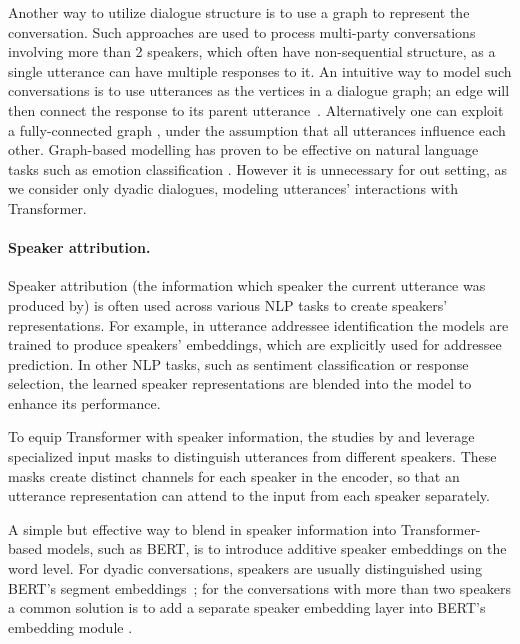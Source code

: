 Another way to utilize dialogue structure is to use a graph to represent the conversation. Such approaches are used to process multi-party conversations involving more than 2 speakers, which often have non-sequential structure, as a single utterance can have multiple responses to it. An intuitive way to model such conversations is to use utterances as the vertices in a dialogue graph; an edge will then connect the response to its parent utterance~\cite{hu2019gsn}. Alternatively one can exploit a fully-connected graph \cite{ghosal2019dialoguegcn}, under the assumption that all utterances influence each other. Graph-based modelling has proven to be effective on natural language tasks such as emotion classification \cite{zhang2019modeling, ghosal2019dialoguegcn}. However it is unnecessary for out setting, as we consider only dyadic dialogues, modeling utterances' interactions with Transformer. %

\paragraph{Speaker attribution.} Speaker attribution (the information which speaker the current utterance was produced by) is often used across various NLP tasks to create speakers' representations. For example, in utterance addressee identification \cite{le2019speaking, ouchi2016addressee} the models are trained to produce speakers' embeddings, which are explicitly used for addressee prediction. In other NLP tasks, such as sentiment classification or response selection, the learned speaker representations are blended into the model to enhance its performance.

To equip Transformer with speaker information, the studies by \citet{liu2021filling} and \citet{li2020hierarchical2} leverage specialized input masks to distinguish utterances from different speakers. These masks create distinct channels for each speaker in the encoder, so that an utterance representation can attend to the input from each speaker separately.

A simple but effective way to blend in speaker information into Transformer-based models, such as BERT, is to introduce additive speaker embeddings on the word level. For dyadic conversations, speakers are usually distinguished using BERT's segment embeddings~\cite{lu2020improving}; for the conversations with more than two speakers a common solution is to 
add a separate speaker embedding layer into BERT's embedding module \cite{gu2020speaker, yu-etal-2020-dialogue}.

